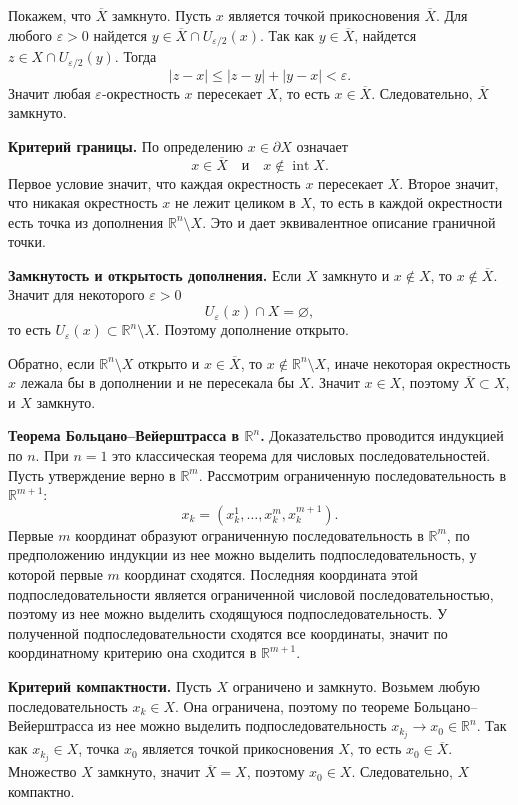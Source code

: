 \documentclass[12pt,a4paper]{article}
\newcommand{\R}{\mathbb{R}}
\newcommand{\eps}{\varepsilon}
\newcommand{\Ball}[2]{U_{#1}(#2)}
\begin{document}
Покажем, что \(\overline X\) замкнуто. Пусть \(x\) является точкой
прикосновения \(\overline X\). Для любого \(\eps>0\) найдется
\(y\in\overline X\cap \Ball{\eps/2}{x}\). Так как \(y\in\overline X\), найдется
\(z\in X\cap\Ball{\eps/2}{y}\). Тогда
\[
  |z-x|\le |z-y|+|y-x|<\eps.
\]
Значит любая \(\eps\)-окрестность \(x\) пересекает \(X\), то есть
\(x\in\overline X\). Следовательно, \(\overline X\) замкнуто.

\textbf{Критерий границы.}
По определению \(x\in\partial X\) означает
\[
  x\in\overline X
  \quad\text{и}\quad
  x\notin\operatorname{int}X.
\]
Первое условие значит, что каждая окрестность \(x\) пересекает \(X\). Второе
значит, что никакая окрестность \(x\) не лежит целиком в \(X\), то есть в
каждой окрестности есть точка из дополнения \(\R^n\setminus X\). Это и дает
эквивалентное описание граничной точки.

\textbf{Замкнутость и открытость дополнения.}
Если \(X\) замкнуто и \(x\notin X\), то \(x\notin\overline X\). Значит для
некоторого \(\eps>0\)
\[
  \Ball{\eps}{x}\cap X=\varnothing,
\]
то есть \(\Ball{\eps}{x}\subset\R^n\setminus X\). Поэтому дополнение открыто.

Обратно, если \(\R^n\setminus X\) открыто и \(x\in\overline X\), то \(x\notin
\R^n\setminus X\), иначе некоторая окрестность \(x\) лежала бы в дополнении и
не пересекала бы \(X\). Значит \(x\in X\), поэтому \(\overline X\subset X\),
и \(X\) замкнуто.

\textbf{Теорема Больцано--Вейерштрасса в \(\R^n\).}
Доказательство проводится индукцией по \(n\). При \(n=1\) это классическая
теорема для числовых последовательностей. Пусть утверждение верно в
\(\R^m\). Рассмотрим ограниченную последовательность в \(\R^{m+1}\):
\[
  x_k=(x_k^1,\dots,x_k^m,x_k^{m+1}).
\]
Первые \(m\) координат образуют ограниченную последовательность в \(\R^m\),
по предположению индукции из нее можно выделить подпоследовательность, у
которой первые \(m\) координат сходятся. Последняя координата этой
подпоследовательности является ограниченной числовой последовательностью,
поэтому из нее можно выделить сходящуюся подпоследовательность. У полученной
подпоследовательности сходятся все координаты, значит по координатному
критерию она сходится в \(\R^{m+1}\).

\textbf{Критерий компактности.}
Пусть \(X\) ограничено и замкнуто. Возьмем любую последовательность
\(x_k\in X\). Она ограничена, поэтому по теореме Больцано--Вейерштрасса из
нее можно выделить подпоследовательность \(x_{k_j}\to x_0\in\R^n\). Так как
\(x_{k_j}\in X\), точка \(x_0\) является точкой прикосновения \(X\), то есть
\(x_0\in\overline X\). Множество \(X\) замкнуто, значит
\(\overline X=X\), поэтому \(x_0\in X\). Следовательно, \(X\) компактно.
\end{document}
